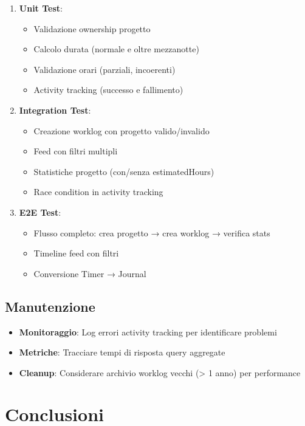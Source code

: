 \documentclass[11pt,a4paper]{article}
\begin{document}
\begin{enumerate}
    \item \textbf{Unit Test}:
    \begin{itemize}
        \item Validazione ownership progetto
        \item Calcolo durata (normale e oltre mezzanotte)
        \item Validazione orari (parziali, incoerenti)
        \item Activity tracking (successo e fallimento)
    \end{itemize}
    
    \item \textbf{Integration Test}:
    \begin{itemize}
        \item Creazione worklog con progetto valido/invalido
        \item Feed con filtri multipli
        \item Statistiche progetto (con/senza estimatedHours)
        \item Race condition in activity tracking
    \end{itemize}
    
    \item \textbf{E2E Test}:
    \begin{itemize}
        \item Flusso completo: crea progetto → crea worklog → verifica stats
        \item Timeline feed con filtri
        \item Conversione Timer → Journal
    \end{itemize}
\end{enumerate}

\subsection{Manutenzione}

\begin{itemize}
    \item \textbf{Monitoraggio}: Log errori activity tracking per identificare problemi
    \item \textbf{Metriche}: Tracciare tempi di risposta query aggregate
    \item \textbf{Cleanup}: Considerare archivio worklog vecchi (> 1 anno) per performance
\end{itemize}

\section{Conclusioni}
\end{document}
